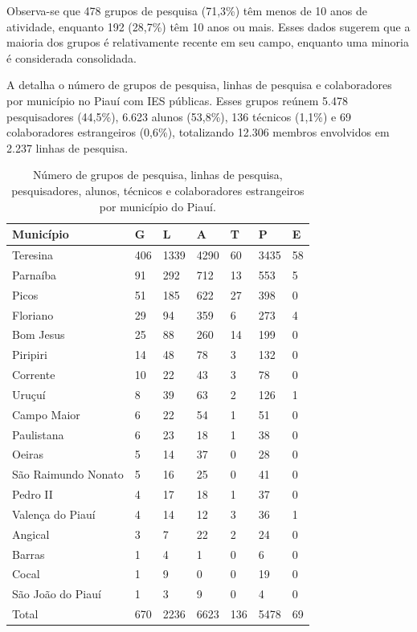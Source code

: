\documentclass[portuguese]{textolivre}
\begin{document}
Observa-se que 478 grupos de pesquisa (71,3\%) têm menos de 10 anos de atividade, enquanto 192 (28,7\%) têm 10 anos ou mais. Esses dados sugerem que a maioria dos grupos é relativamente recente em seu campo, enquanto uma minoria é considerada consolidada.

A  detalha o número de grupos de pesquisa, linhas de pesquisa e colaboradores por município no Piauí com IES públicas. Esses grupos reúnem 5.478 pesquisadores (44,5\%), 6.623 alunos (53,8\%), 136 técnicos (1,1\%) e 69 colaboradores estrangeiros (0,6\%), totalizando 12.306 membros envolvidos em 2.237 linhas de pesquisa.

\begin{table}[htbp]
\centering
\begin{threeparttable}
\caption{Número de grupos de pesquisa, linhas de pesquisa, pesquisadores, alunos, técnicos e colaboradores estrangeiros por município do Piauí.}
\label{tbl1}
\begin{tabular}{lllllll}
\toprule
Município & G & L & A & T & P & E \\ 
\midrule
Teresina & 406 & 1339 & 4290 & 60 & 3435 & 58 \\
Parnaíba & 91 & 292 & 712 & 13 & 553 & 5 \\
Picos & 51 & 185 & 622 & 27 & 398 & 0 \\
Floriano & 29 & 94 & 359 & 6 & 273 & 4 \\
Bom Jesus & 25 & 88 & 260 & 14 & 199 & 0 \\
Piripiri & 14 & 48 & 78 & 3 & 132 & 0 \\
Corrente & 10 & 22 & 43 & 3 & 78 & 0 \\
Uruçuí & 8 & 39 & 63 & 2 & 126 & 1 \\
Campo Maior & 6 & 22 & 54 & 1 & 51 & 0 \\
Paulistana & 6 & 23 & 18 & 1 & 38 & 0 \\
Oeiras & 5 & 14 & 37 & 0 & 28 & 0 \\
São Raimundo Nonato & 5 & 16 & 25 & 0 & 41 & 0 \\
Pedro II & 4 & 17 & 18 & 1 & 37 & 0 \\
Valença do Piauí & 4 & 14 & 12 & 3 & 36 & 1 \\
Angical & 3 & 7 & 22 & 2 & 24 & 0 \\
Barras & 1 & 4 & 1 & 0 & 6 & 0 \\
Cocal & 1 & 9 & 0 & 0 & 19 & 0 \\
São João do Piauí & 1 & 3 & 9 & 0 & 4 & 0 \\
\midrule
Total & 670 & 2236 & 6623 & 136 & 5478 & 69 \\

\end{tabular}
\end{threeparttable}
\end{table}
\end{document}
